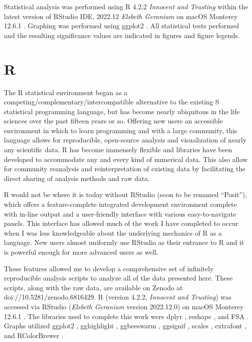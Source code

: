 Statistical analysis was performed using R 4.2.2 \textit{Innocent and Trusting} within the latest version of RStudio IDE, 2022.12 \textit{Elsbeth Geranium} on macOS Monterey 12.6.1 \citep{RCoreTeam2022, RStudioTeam2022}. Graphing was performed using ggplot2 \citep{Wickham2016, Wickham2022b}. All statistical tests performed and the resulting significance values are indicated in figures and figure legends.

\section{R}\label{meth:R}

The R statistical environment began as a competing/complementary/intercompatible alternative to the existing S statistical programming language, but has become nearly ubiquitous in the life sciences over the past fifteen years or so. Offering new users an accessible environment in which to learn programming and with a large community, this language allows for reproducible, open-source analysis and visualization of nearly any scientific data. R has become immensely flexible and libraries have been developed to accommodate any and every kind of numerical data. This also allow for community reanalysis and reinterpretation of existing data by facilitating the direct sharing of analysis methods and raw data. 

R would not be where it is today without RStudio (soon to be renamed ``Posit''), which offers a feature-complete integrated development environment complete with in-line output and a user-friendly interface with various easy-to-navigate panels. This interface has allowed much of the work I have completed to occur when I was less knowledgeable about the underlying mechanics of R as a language. New users almost uniformly use RStudio as their entrance to R and it is powerful enough for more advanced users as well.

These features allowed me to develop a comprehensive set of infinitely reproducible analysis scripts to analyze all of the data presented here. These scripts, along with the raw data, are available on Zenodo at doi://10.5281/zenodo.6816429. R (version 4.2.2, \textit{Innocent and Trusting}) was accessed via RStudio (\textit{Elsbeth Geranium} version 2022.12.0) on macOS Monterey 12.6.1 \citep{RCoreTeam2022, RStudioTeam2022}. The libraries used to complete this work were dplyr \citep{Wickham2022d}, reshape \citep{Wickham2022a}, and FSA \citep{Ogle2022}. Graphs utilized ggplot2 \citep{Wickham2009, Wickham2016, Wickham2022b}, gghighlight \citep{Yutani2022}, ggbeeswarm \citep{Clarke2017}, ggsignif \citep{AhlmannEltze2021}, scales \citep{Wickham2022c}, extrafont \citep{Chang2022}, and RColorBrewer \citep{Neuwirth2022}.


